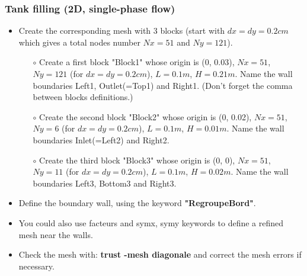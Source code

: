 \documentclass[10pt, hyperref={unicode=true,pdfusetitle, bookmarks=true,bookmarksnumbered=false,bookmarksopen=false, breaklinks=false,pdfborder={0 0 1},backref=true,colorlinks=true,linkcolor=darkblue,pageanchor}]{beamer}
\begin{document}
\begin{frame}
\frametitle{Tank filling (2D, single-phase flow)}
\begin{block}{}

\begin{itemize}
\item Create the corresponding mesh with 3 blocks (start with $dx=dy=0.2cm$ which gives a total nodes number $Nx=51$ and $Ny=121$). 
    \begin{itemize}
    \item [$\circ$] Create a first block "Block1" whose origin is (0, 0.03), $Nx=51$, $Ny=121$ (for $dx=dy=0.2cm$), $L=0.1 m$, $H=0.21 m$. Name the wall boundaries Left1, Outlet(=Top1) and Right1. (Don't forget the comma between blocks definitions.)
    \item [$\circ$] Create the second block "Block2" whose origin is (0, 0.02), $Nx=51$, $Ny=6$ (for $dx=dy=0.2cm$), $L=0.1 m$, $H=0.01 m$. Name the wall boundaries Inlet(=Left2) and Right2.
    \item [$\circ$] Create the third block "Block3" whose origin is (0, 0), $Nx=51$, $Ny=11$ (for $dx=dy=0.2cm$), $L=0.1 m$, $H=0.02 m$. Name the wall boundaries Left3, Bottom3 and Right3.
    \end{itemize}
\item Define the boundary wall, using the keyword \textbf{"RegroupeBord"}.
\item You could also use facteurs and symx, symy keywords to define a refined mesh near the walls. 
\item Check the mesh with: \textbf{trust -mesh diagonale} and correct the mesh errors if necessary.
\end{itemize}

\end{block}
\end{frame}
\end{document}
